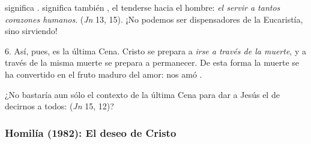 \begin{body}
 significa .  significa también , el tenderse hacia el hombre: \textit{el servir a tantos corazones humanos}.  (\textit{Jn} 13, 15). ¡No podemos ser dispensadores de la Eucaristía, sino sirviendo!

6. Así, pues, es la última Cena. Cristo se prepara a \textit{irse a través de la muerte}, y a través de la misma muerte se prepara a permanecer. De esta forma la muerte se ha convertido en el fruto maduro del amor: nos amó .

¿No bastaría aun sólo el contexto de la última Cena para dar a Jesús el  de decirnos a todos:  (\textit{Jn} 15, 12)?
\end{body}


\subsubsection{Homilía (1982): El deseo de Cristo}


